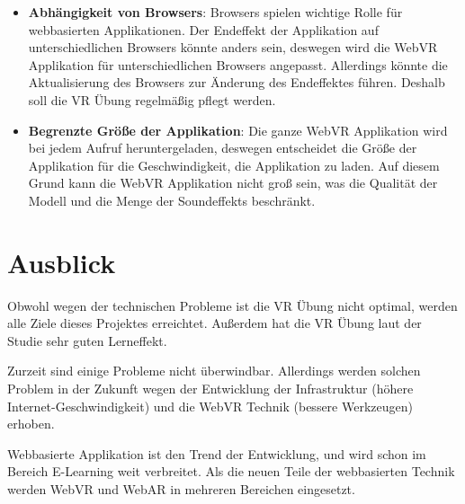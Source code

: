 \begin{itemize}
    \item \textbf{Abhängigkeit von Browsers}: Browsers spielen wichtige Rolle für webbasierten Applikationen. Der Endeffekt der Applikation auf unterschiedlichen Browsers könnte anders sein, deswegen wird die WebVR Applikation für unterschiedlichen Browsers angepasst. Allerdings könnte die Aktualisierung des Browsers zur Änderung des Endeffektes führen. Deshalb soll die VR Übung regelmäßig pflegt werden.
    
    \item \textbf{Begrenzte Größe der Applikation}: Die ganze WebVR Applikation wird bei jedem Aufruf heruntergeladen, deswegen entscheidet die Größe der Applikation für die Geschwindigkeit, die Applikation zu laden. Auf diesem Grund kann die WebVR Applikation nicht groß sein, was die Qualität der Modell und die Menge der Soundeffekts beschränkt.
\end{itemize}

\section{Ausblick}

Obwohl wegen der technischen Probleme ist die VR Übung nicht optimal, werden alle Ziele dieses Projektes erreichtet. Außerdem hat die VR Übung laut der Studie sehr guten Lerneffekt.

Zurzeit sind einige Probleme nicht überwindbar. Allerdings werden solchen Problem in der Zukunft wegen der Entwicklung der Infrastruktur (höhere Internet-Geschwindigkeit) und die WebVR Technik (bessere Werkzeugen) erhoben.

Webbasierte Applikation ist den Trend der Entwicklung, und wird schon im Bereich E-Learning weit verbreitet. Als die neuen Teile der webbasierten Technik werden WebVR und WebAR in mehreren Bereichen eingesetzt.

